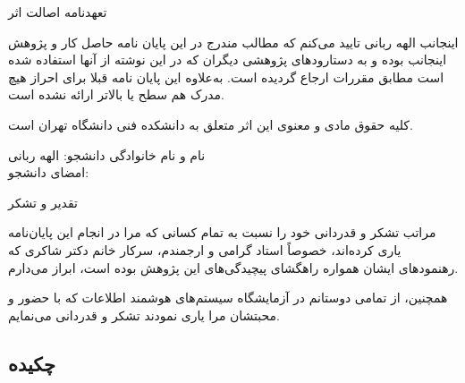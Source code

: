 \documentclass[twoside, a4paper,11pt]{book}
\numberwithin{equation}{chapter}
\numberwithin{table}{chapter}
\numberwithin{figure}{chapter}
\numberwithin{equation}{chapter}
\begin{document}
\newpage
\thispagestyle{empty}
\mbox{}

\newpage
\thispagestyle{empty}
{ \LARGE 
\begin{center}
تعهدنامه اصالت اثر
\end{center}}
اینجانب الهه ربانی تایید می‌کنم که مطالب مندرج در این پایان نامه حاصل کار و پژوهش اینجانب بوده و به دستارود‌های پژوهشی دیگران که در این نوشته از آنها استفاده شده است مطابق مقررات ارجاع گردیده است. به‌علاوه این پایان نامه قبلا برای احراز هیچ مدرک هم سطح یا بالاتر ارائه نشده است.
\par
کلیه حقوق مادی و معنوی این اثر متعلق به دانشکده فنی دانشگاه تهران است.
\par 
\vskip 2cm


\begin{flushleft}
نام و نام خانوادگی دانشجو: الهه ربانی \hspace{1.75cm}~~~~~~~ \\
امضای دانشجو: ~~~~~~~~~~~~~~~~~~~~~~~~~~~~~~~~~~~~~~~~~~~~~~~~~~~~~
\end{flushleft}

\newpage
\thispagestyle{empty}
\mbox{}




\newpage
\thispagestyle{empty}
\mbox{}


\newpage
\thispagestyle{empty}
{\nastaliqbig \Huge 
تقدیر و تشکر\nastaliq

{\par\vspace{1cm}}
\LARGE
\begin{adjustwidth}{1cm}{}
مراتب تشکر و قدردانی خود را نسبت به تمام کسانی که مرا در انجام این پایان‌نامه یاری کرده‌اند، خصوصاً استاد گرامی و ارجمندم، سرکار خانم دکتر شاکری که رهنمودهای ایشان همواره راهگشای پیچیدگی‌های این پژوهش بوده است، ابراز می‌دارم. 

همچنین، از تمامی دوستانم در آزمایشگاه سیستم‌های هوشمند اطلاعات که با حضور و محبتشان مرا یاری نمودند تشکر و قدردانی می‌نمایم. 

\end{adjustwidth}
}


\newpage
\thispagestyle{empty}
\mbox{}


\pagestyle{plain}

\newpage

\begin{center}
\vspace*{-2.6cm}
\subsection*{چکیده}
\end{center}
\vspace*{-.4cm}
\end{document}
